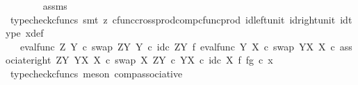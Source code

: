 \begin{isabellebody}
\ \ \ \ \ \ \isamarkupfalse%
\ assms\ \isamarkupfalse%
\ {\isacharparenleft}{\kern0pt}typecheck{\isacharunderscore}{\kern0pt}cfuncs{\isacharcomma}{\kern0pt}\ smt\ {\isacharparenleft}{\kern0pt}z{}{\isacharparenright}{\kern0pt}\ cfunc{\isacharunderscore}{\kern0pt}cross{\isacharunderscore}{\kern0pt}prod{\isacharunderscore}{\kern0pt}comp{\isacharunderscore}{\kern0pt}cfunc{\isacharunderscore}{\kern0pt}prod\ id{\isacharunderscore}{\kern0pt}left{\isacharunderscore}{\kern0pt}unit{}\ id{\isacharunderscore}{\kern0pt}right{\isacharunderscore}{\kern0pt}unit{}\ id{\isacharunderscore}{\kern0pt}type\ x{\isacharunderscore}{\kern0pt}def{\isacharparenright}{\kern0pt}\isanewline
\ \ \ \ \isamarkupfalse%
\ \isamarkupfalse%
\ {\isachardoublequoteopen}{\isachardot}{\kern0pt}{\isachardot}{\kern0pt}{\isachardot}{\kern0pt}\ {\isacharequal}{\kern0pt}\ {\isacharparenleft}{\kern0pt}{\isacharparenleft}{\kern0pt}eval{\isacharunderscore}{\kern0pt}func\ Z\ Y\ {\isasymcirc}\isactrlsub c\ swap\ {\isacharparenleft}{\kern0pt}Z\isactrlbsup Y\isactrlesup {\isacharparenright}{\kern0pt}\ Y\ {\isasymcirc}\isactrlsub c\ {\isacharparenleft}{\kern0pt}id\isactrlsub c\ {\isacharparenleft}{\kern0pt}Z\isactrlbsup Y\isactrlesup {\isacharparenright}{\kern0pt}\ {\isasymtimes}\isactrlsub f\ eval{\isacharunderscore}{\kern0pt}func\ Y\ X\ {\isasymcirc}\isactrlsub c\ swap\ {\isacharparenleft}{\kern0pt}Y\isactrlbsup X\isactrlesup {\isacharparenright}{\kern0pt}\ X{\isacharparenright}{\kern0pt}\ {\isasymcirc}\isactrlsub c\ associate{\isacharunderscore}{\kern0pt}right\ {\isacharparenleft}{\kern0pt}Z\isactrlbsup Y\isactrlesup {\isacharparenright}{\kern0pt}\ {\isacharparenleft}{\kern0pt}Y\isactrlbsup X\isactrlesup {\isacharparenright}{\kern0pt}\ X\ {\isasymcirc}\isactrlsub c\ swap\ X\ {\isacharparenleft}{\kern0pt}Z\isactrlbsup Y\isactrlesup \ {\isasymtimes}\isactrlsub c\ Y\isactrlbsup X\isactrlesup {\isacharparenright}{\kern0pt}{\isacharparenright}{\kern0pt}\ {\isasymcirc}\isactrlsub c\ id\isactrlsub c\ X\ {\isasymtimes}\isactrlsub f\ {\isasymlangle}f{\isacharcomma}{\kern0pt}g{\isasymrangle}{\isacharparenright}{\kern0pt}\ {\isasymcirc}\isactrlsub c\ x{}{\isachardoublequoteclose}\isanewline
\ \ \ \ \ \ \isamarkupfalse%
\ {\isacharparenleft}{\kern0pt}typecheck{\isacharunderscore}{\kern0pt}cfuncs{\isacharcomma}{\kern0pt}\ meson\ comp{\isacharunderscore}{\kern0pt}associative{}{\isacharparenright}{\kern0pt}\isanewline
\ \ \ \ \isamarkupfalse%
\ \isamarkupfalse%

\end{isabellebody}
